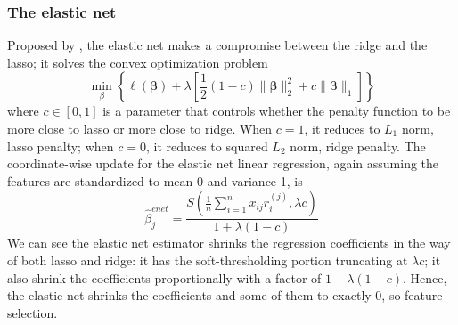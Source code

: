 \subsubsection{The elastic net}
Proposed by \cite{zou2005regularization}, the elastic net makes a compromise between the ridge and the lasso; it solves the convex optimization problem
\begin{equation}
    \min_{\beta} \left\{ \ell(\bm{\beta})+\lambda\left[\frac{1}{2}(1-c)\|\bm{\beta}\|_2^2+c\|\bm{\beta}\|_1\right] \label{eq1.10} \right\} 
\end{equation}
where $c\in [0,1]$ is a parameter that controls whether the penalty function to be more close to lasso or more close to ridge. When $c=1$, it reduces to $L_1$ norm, lasso penalty; when $c=0$, it reduces to squared $L_2$ norm, ridge penalty. The coordinate-wise update for the elastic net linear regression, again assuming the features are standardized to mean 0 and variance 1, is 
\begin{equation}
    \hat{\beta}_j^{enet} = \frac{S(\frac{1}{n}\sum_{i=1}^{n}x_{ij}r_i^{(j)}, \lambda c)}{1+\lambda(1-c)} \label{eq1.11}
\end{equation}
We can see the elastic net estimator shrinks the regression coefficients in the way of both lasso and ridge: it has the soft-thresholding portion truncating at $\lambda c$; it also shrink the coefficients proportionally with a factor of $1+\lambda(1-c)$. Hence, the elastic net shrinks the coefficients and some of them to exactly 0, so feature selection.

